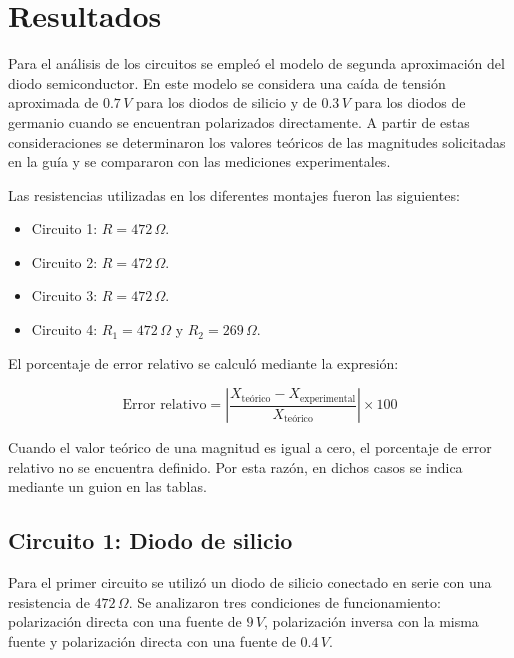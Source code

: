 \section{Resultados}

Para el análisis de los circuitos se empleó el modelo de segunda aproximación del diodo semiconductor. En este modelo se considera una caída de tensión aproximada de \(0.7\,V\) para los diodos de silicio y de \(0.3\,V\) para los diodos de germanio cuando se encuentran polarizados directamente. A partir de estas consideraciones se determinaron los valores teóricos de las magnitudes solicitadas en la guía y se compararon con las mediciones experimentales.

\vspace{0.3cm}

Las resistencias utilizadas en los diferentes montajes fueron las siguientes:

\begin{itemize}
    \item Circuito 1: \(R=472\,\Omega\).
    \item Circuito 2: \(R=472\,\Omega\).
    \item Circuito 3: \(R=472\,\Omega\).
    \item Circuito 4: \(R_1=472\,\Omega\) y \(R_2=269\,\Omega\).
\end{itemize}

\vspace{0.3cm}

El porcentaje de error relativo se calculó mediante la expresión:

\[
\text{Error relativo} =
\left|\frac{X_{\text{teórico}}-X_{\text{experimental}}}
{X_{\text{teórico}}}\right|\times 100
\]

\vspace{0.3cm}

Cuando el valor teórico de una magnitud es igual a cero, el porcentaje de error relativo no se encuentra definido. Por esta razón, en dichos casos se indica mediante un guion en las tablas.

\subsection{Circuito 1: Diodo de silicio}

Para el primer circuito se utilizó un diodo de silicio conectado en serie con una resistencia de \(472\,\Omega\). Se analizaron tres condiciones de funcionamiento: polarización directa con una fuente de \(9\,V\), polarización inversa con la misma fuente y polarización directa con una fuente de \(0.4\,V\).

